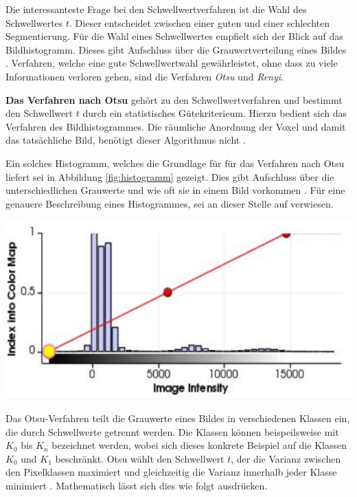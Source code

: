 Die interessanteste Frage bei den Schwellwertverfahren ist die Wahl des Schwellwertes
$t$. Dieser entscheidet zwischen einer guten und einer schlechten Segmentierung.
Für die Wahl eines Schwellwertes empfielt sich der Blick auf das Bildhistogramm.
Dieses gibt Aufschluss über die Grauwertverteilung eines Bildes \citep[vgl.][S.~361]{lehmann2013bildverarbeitung}.
Verfahren, welche eine gute Schwellwertwahl gewährleistet, ohne dass zu viele
Informationen verloren gehen, sind die Verfahren \textit{Otsu} und \textit{Renyi}.

\pagebreak

\textbf{Das Verfahren nach Otsu} gehört zu den Schwellwertverfahren und bestimmt
den Schwellwert $t$ durch ein statistisches Gütekriterieum. Hierzu bedient sich
das Verfahren des Bildhistogrammes. Die räumliche Anordnung der Voxel und damit das
tatsächliche Bild, benötigt dieser Algorithmus nicht \citep[vgl.][S.~264]{lehmann2013bildverarbeitung}.

\begin{minipage}{0.40\textwidth}
	Ein solches Histogramm, welches die Grundlage für für das Verfahren nach Otsu
	liefert sei in Abbildung \ref{fig:histogramm} gezeigt. Dies gibt Aufschluss über
	die unterschiedlichen Grauwerte und wie oft sie in einem Bild vorkommen \citep[vgl.][S.~264]{lehmann2013bildverarbeitung}.
	Für eine genauere Beschreibung eines Histogrammes, sei an dieser Stelle auf
	\citet[S.~42]{burger2009} verwiesen.
\end{minipage}
\hfill
\begin{minipage}{0.50\textwidth}
	\centering
	\includegraphics[width=1\textwidth]{img/histogramm.jpg}
	\label{fig:histogramm}
\end{minipage}

Das Otsu-Verfahren teilt die Grauwerte eines Bildes in verschiedenen Klassen ein,
die durch Schwellwerte getrennt werden. Die Klassen können beispeilsweise mit
$K_{0}$ bis $K_{n}$ bezeichnet werden, wobei sich dieses konkrete Beispiel auf die
Klassen $K_{0}$ und $K_{1}$ beschränkt. Otsu wählt den Schwellwert $t$, der die Varianz
zwischen den Pixelklassen maximiert und gleichzeitig die Varianz innerhalb jeder
Klasse minimiert \citep[vgl.][S.~264]{lehmann2013bildverarbeitung}. Mathematisch
lässt sich dies wie folgt ausdrücken.

